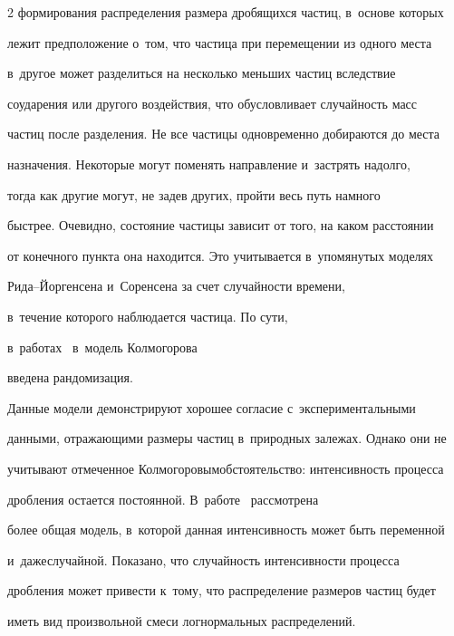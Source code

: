 \begin{multicols}{2}
формирования распределения размера дробящихся частиц, в~основе которых 


лежит предположение о~том, что час\-ти\-ца при перемещении из одного места 


в~другое может разделиться на несколько меньших частиц вследствие 


соударения или другого воздействия, что обусловливает случайность масс 


частиц после разделения. Не все частицы одновременно добираются до места 


назначения. Некоторые могут поменять направление и~застрять надолго, 


тогда как другие могут, не задев других, пройти весь путь намного 


быстрее. Очевидно, состояние частицы зависит от того, на каком расстоянии 


от конечного пункта она находится. Это учитывается в~упомянутых моделях 


Ри\-да--Йор\-ген\-се\-на и~Соренсена за счет случайности времени, 


в~течение которого наблюдается частица. По сути, 


в~работах~\cite{ReedJorgensen2003,Sorensen2006} в~модель Колмогорова 


введена рандомизация.





Данные модели демонстрируют хорошее согласие с~экспериментальными 


данными, отражающими размеры частиц в~природных залежах. Однако они не 


учитывают отмеченное Колмогоровым\linebreak обстоятельство: интенсивность процесса 


дробления остается постоянной. В~работе~\cite{Korolev2009} рас\-смот\-рена 


более общая модель, в~которой данная интенсивность может быть переменной 


и~даже\linebreak случайной. Показано, что случайность интенсивности процесса 


дробления может привести к~тому, что распределение размеров частиц будет 


иметь вид произвольной смеси логнормальных рас\-пре\-де\-ле\-ний.


{ %





}
\end{multicols}
